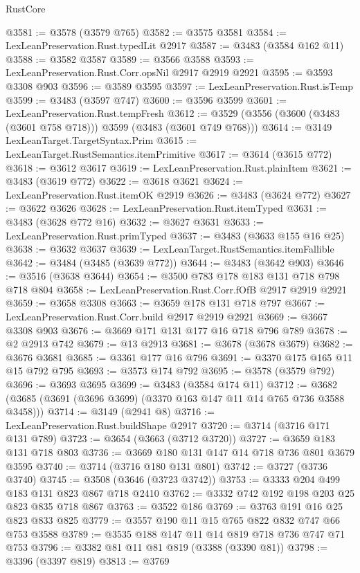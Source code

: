 \begin{lexlean}{RustCore}
\begin{coremodule}
@3581 := @3578 (@3579 @765)
@3582 := @3575 @3581
@3584 := LexLeanPreservation.Rust.typedLit @2917
@3587 := @3483 (@3584 @162 @11)
@3588 := @3582 @3587
@3589 := @3566 @3588
@3593 := LexLeanPreservation.Rust.Corr.opsNil @2917 @2919 @2921
@3595 := @3593 @3308 @903
@3596 := @3589 @3595
@3597 := LexLeanPreservation.Rust.isTemp
@3599 := @3483 (@3597 @747)
@3600 := @3596 @3599
@3601 := LexLeanPreservation.Rust.tempFresh
@3612 := @3529 (@3556 (@3600 (@3483 (@3601 @758 @718))) @3599 (@3483 (@3601 @749 @768)))
@3614 := @3149 LexLeanTarget.TargetSyntax.Prim
@3615 := LexLeanTarget.RustSemantics.itemPrimitive
@3617 := @3614 (@3615 @772)
@3618 := @3612 @3617
@3619 := LexLeanPreservation.Rust.plainItem
@3621 := @3483 (@3619 @772)
@3622 := @3618 @3621
@3624 := LexLeanPreservation.Rust.itemOK @2919
@3626 := @3483 (@3624 @772)
@3627 := @3622 @3626
@3628 := LexLeanPreservation.Rust.itemTyped
@3631 := @3483 (@3628 @772 @16)
@3632 := @3627 @3631
@3633 := LexLeanPreservation.Rust.primTyped
@3637 := @3483 (@3633 @155 @16 @25)
@3638 := @3632 @3637
@3639 := LexLeanTarget.RustSemantics.itemFallible
@3642 := @3484 (@3485 (@3639 @772))
@3644 := @3483 (@3642 @903)
@3646 := @3516 (@3638 @3644)
@3654 := @3500 @783 @178 @183 @131 @718 @798 @718 @804
@3658 := LexLeanPreservation.Rust.Corr.fOfB @2917 @2919 @2921
@3659 := @3658 @3308
@3663 := @3659 @178 @131 @718 @797
@3667 := LexLeanPreservation.Rust.Corr.build @2917 @2919 @2921
@3669 := @3667 @3308 @903
@3676 := @3669 @171 @131 @177 @16 @718 @796 @789
@3678 := @2 @2913 @742
@3679 := @13 @2913
@3681 := @3678 (@3678 @3679)
@3682 := @3676 @3681
@3685 := @3361 @177 @16 @796
@3691 := @3370 @175 @165 @11 @15 @792 @795
@3693 := @3573 @174 @792
@3695 := @3578 (@3579 @792)
@3696 := @3693 @3695
@3699 := @3483 (@3584 @174 @11)
@3712 := @3682 (@3685 (@3691 (@3696 @3699) (@3370 @163 @147 @11 @14 @765 @736 @3588 @3458)))
@3714 := @3149 (@2941 @8)
@3716 := LexLeanPreservation.Rust.buildShape @2917
@3720 := @3714 (@3716 @171 @131 @789)
@3723 := @3654 (@3663 (@3712 @3720))
@3727 := @3659 @183 @131 @718 @803
@3736 := @3669 @180 @131 @147 @14 @718 @736 @801 @3679 @3595
@3740 := @3714 (@3716 @180 @131 @801)
@3742 := @3727 (@3736 @3740)
@3745 := @3508 (@3646 (@3723 @3742))
@3753 := @3333 @204 @499 @183 @131 @823 @867 @718 @2410
@3762 := @3332 @742 @192 @198 @203 @25 @823 @835 @718 @867
@3763 := @3522 @186
@3769 := @3763 @191 @16 @25 @823 @833 @825
@3779 := @3557 @190 @11 @15 @765 @822 @832 @747 @66 @753 @3588
@3789 := @3535 @188 @147 @11 @14 @819 @718 @736 @747 @71 @753
@3796 := @3382 @81 @11 @81 @819 (@3388 (@3390 @81))
@3798 := @3396 (@3397 @819)
@3813 := @3769

\end{coremodule}
\end{lexlean}
